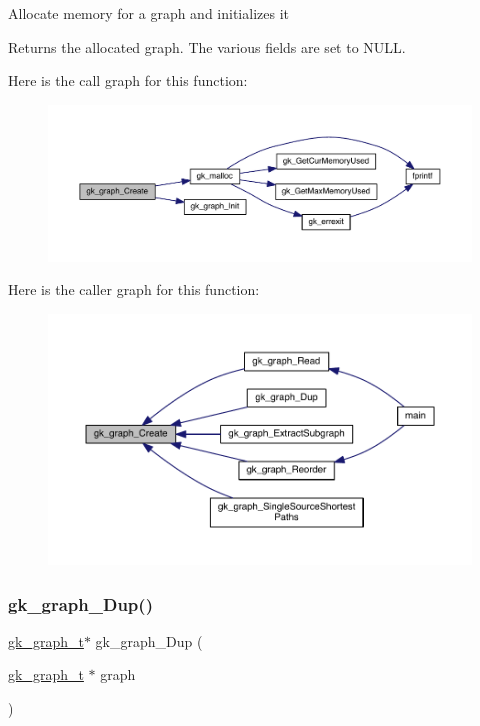 Allocate memory for a graph and initializes it \begin{DoxyReturn}{Returns}
the allocated graph. The various fields are set to N\+U\+LL. 
\end{DoxyReturn}
Here is the call graph for this function\+:\nopagebreak
\begin{figure}[H]
\begin{center}
\leavevmode
\includegraphics[width=350pt]{a00077_a0d092a371d797437de53ae1a64bd78f4_cgraph}
\end{center}
\end{figure}
Here is the caller graph for this function\+:\nopagebreak
\begin{figure}[H]
\begin{center}
\leavevmode
\includegraphics[width=350pt]{a00077_a0d092a371d797437de53ae1a64bd78f4_icgraph}
\end{center}
\end{figure}
\mbox{\label{a00077_a24db906b45a9848fc26c49cb967d68c8}} 
\subsubsection{\texorpdfstring{gk\+\_\+graph\+\_\+\+Dup()}{gk\_graph\_Dup()}}
{\footnotesize\ttfamily \hyperlink{a00638}{gk\+\_\+graph\+\_\+t}$\ast$ gk\+\_\+graph\+\_\+\+Dup (\begin{DoxyParamCaption}\item[{\hyperlink{a00638}{gk\+\_\+graph\+\_\+t} $\ast$}]{graph }\end{DoxyParamCaption})}

